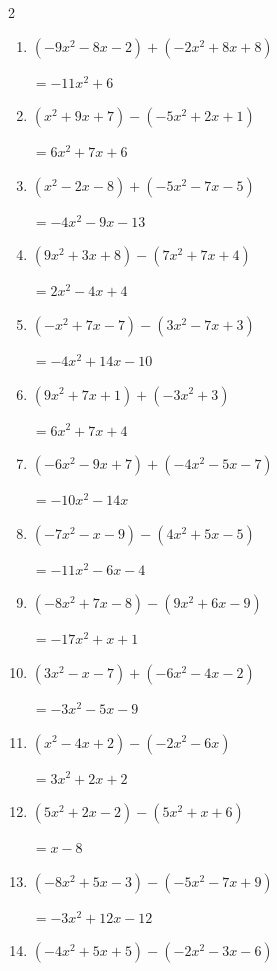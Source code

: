 \begin{multicols}{2}
\begin{enumerate}
  \itemsep=1pt
  \item $(-9x^{2}-8x-2)+(-2x^{2}+8x+8)$

        $=-11x^{2}+6$

  \item $(x^{2}+9x+7)-(-5x^{2}+2x+1)$

        $=6x^{2}+7x+6$

  \item $(x^{2}-2x-8)+(-5x^{2}-7x-5)$

        $=-4x^{2}-9x-13$

  \item $(9x^{2}+3x+8)-(7x^{2}+7x+4)$

        $=2x^{2}-4x+4$

  \item $(-x^{2}+7x-7)-(3x^{2}-7x+3)$

        $=-4x^{2}+14x-10$

  \item $(9x^{2}+7x+1)+(-3x^{2}+3)$

        $=6x^{2}+7x+4$

  \item $(-6x^{2}-9x+7)+(-4x^{2}-5x-7)$

        $=-10x^{2}-14x$

  \item $(-7x^{2}-x-9)-(4x^{2}+5x-5)$

        $=-11x^{2}-6x-4$

  \item $(-8x^{2}+7x-8)-(9x^{2}+6x-9)$

        $=-17x^{2}+x+1$

  \item $(3x^{2}-x-7)+(-6x^{2}-4x-2)$

        $=-3x^{2}-5x-9$

  \item $(x^{2}-4x+2)-(-2x^{2}-6x)$

        $=3x^{2}+2x+2$

  \item $(5x^{2}+2x-2)-(5x^{2}+x+6)$

        $=x-8$

  \item $(-8x^{2}+5x-3)-(-5x^{2}-7x+9)$

        $=-3x^{2}+12x-12$

  \item $(-4x^{2}+5x+5)-(-2x^{2}-3x-6)$


\end{enumerate}
\end{multicols}
